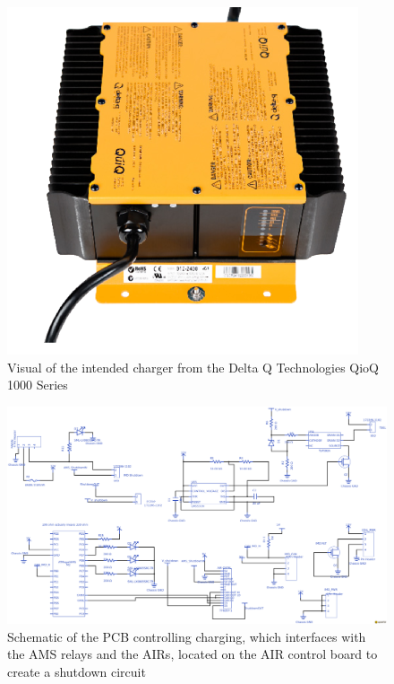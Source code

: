 \documentclass{article}
\begin{document}
\begin{figure}[H]
    \centering
    \includegraphics[width = 0.5 \textwidth]{chargepic}
    \caption{Visual of the intended charger from the Delta Q Technologies QioQ 1000 Series}
    \label{chargepic}
\end{figure}

\begin{figure}[H]
    \centering
    \includegraphics[width = 0.7 \textwidth]{charging}
    \caption{Schematic of the PCB controlling charging, which interfaces with the AMS relays and the AIRs, located on the AIR control board to create a shutdown circuit}
    \label{chargeschem}
\end{figure}
\end{document}
